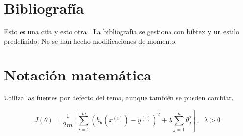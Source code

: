 \section{Bibliografía}

Esto es una cita \cite{RUSSELL} y esto otra \cite{AlphaZero}. La bibliografía se gestiona con bibtex y un estilo predefinido. No se han hecho modificaciones de momento.

\section{Notación matemática}

Utiliza las fuentes por defecto del tema, aunque también se pueden cambiar.


\[
J(\theta)=\frac{1}{2m}\left[ \sum_{i=1}^m\left(h_\theta(x^{(i)})-y^{(i)}\right)^2 + \lambda \sum_{j=1}^n \theta_j^2 \right], \mbox{ } \lambda >0
\]

